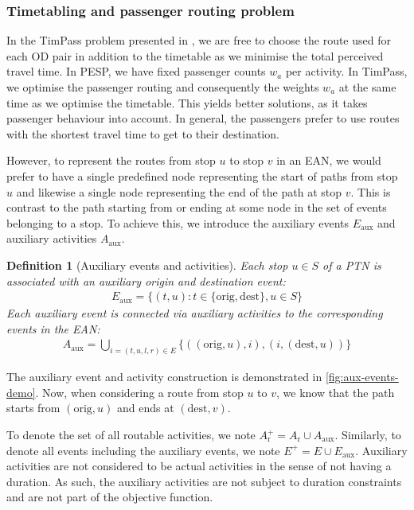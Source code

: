 \documentclass[english, 12pt, a4paper, sci, utf8, a-2b, online]{aaltothesis}
\newtheorem{definition}{Definition}
\newcommand{\Eaux}{E_\text{aux}}
\newcommand{\Ep}{E^+}
\newcommand{\Aaux}{A_\text{aux}}
\newcommand{\Ar}{A_\text{r}}
\newcommand{\Arp}{A_\text{r}^+}
\begin{document}
\subsubsection{Timetabling and passenger routing problem}


In the TimPass problem presented in \cite{timpass-original-2014}, we are free to choose the route used for each OD pair in addition to the timetable as we minimise the total perceived travel time. In PESP, we have fixed passenger counts $w_a$ per activity. In TimPass, we optimise the passenger routing and consequently the weights $w_a$ at the same time as we optimise the timetable. This yields better solutions, as it takes passenger behaviour into account. In general, the passengers prefer to use routes with the shortest travel time to get to their destination.




However, to represent the routes from stop $u$ to stop $v$ in an EAN, we would prefer to have a single predefined node representing the start of paths from stop $u$ and likewise a single node representing the end of the path at stop $v$. This is contrast to the path starting from or ending at some node in the set of events belonging to a stop. To achieve this, we introduce the auxiliary events $\Eaux$ and auxiliary activities $\Aaux$. 

\begin{definition}[Auxiliary events and activities]
    Each stop $u \in S$ of a PTN is associated with an auxiliary origin and destination event: \begin{align*}
        \Eaux = \{(t, u) : t \in \{\text{orig}, \text{dest}\}, u \in S\}
    \end{align*}
    Each auxiliary event is connected via auxiliary activities to the corresponding events in the EAN:
    \begin{align*}
        \Aaux = \bigcup_{i = (t, u, l, r) \in E}\{((\text{orig}, u), i), (i, (\text{dest}, u))\}
    \end{align*} 
\end{definition}
The auxiliary event and activity construction is demonstrated in \ref{fig:aux-events-demo}. Now, when considering a route from stop $u$ to $v$, we know that the path starts from $(\text{orig}, u)$ and ends at $(\text{dest}, v)$.

To denote the set of all routable activities, we note $\Arp = \Ar \cup \Aaux$. Similarly, to denote all events including the auxiliary events, we note $\Ep = E \cup \Eaux$. Auxiliary activities are not considered to be actual activities in the sense of not having a duration. As such, the auxiliary activities are not subject to duration constraints and are not part of the objective function.
\end{document}

